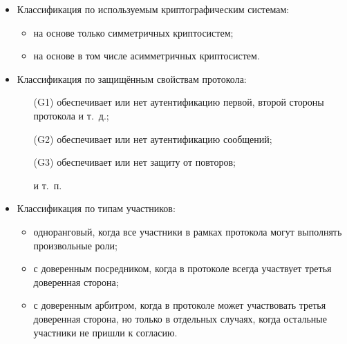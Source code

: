\begin{itemize}
\begin{itemize}
    \end{itemize}
    \item Классификация по используемым криптографическим системам:
    \begin{itemize}
        \item на основе только симметричных криптосистем;
        \item на основе в том числе асимметричных криптосистем.
    \end{itemize}
    \item Классификация по защищённым свойствам протокола:
    \begin{itemize}
        \item[(G1)] обеспечивает или нет аутентификацию первой, второй стороны протокола и т.~д.;
        \item[(G2)] обеспечивает или нет аутентификацию сообщений;
        \item[(G3)] обеспечивает или нет защиту от повторов;
        \item[{}] и т.~п.
    \end{itemize}
    \item Классификация по типам участников:
    \begin{itemize}
        \item одноранговый, когда все участники в рамках протокола могут выполнять произвольные роли;
        \item с доверенным посредником, когда в протоколе всегда участвует третья доверенная сторона;
        \item с доверенным арбитром, когда в протоколе может участвовать третья доверенная сторона, но только в отдельных случаях, когда остальные участники не пришли к согласию.
    \end{itemize}
\end{itemize}

